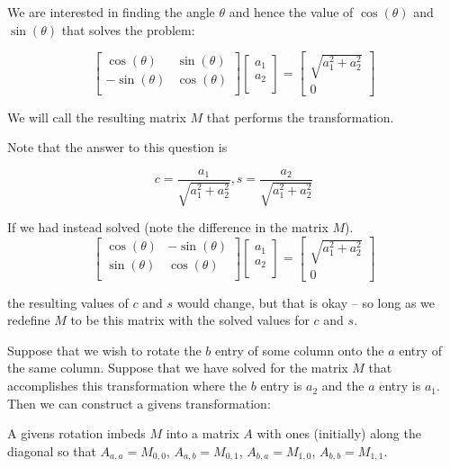 \documentclass[../main.tex]{subfiles}
\begin{document}
\begin{remark}
    We are interested in finding the angle $\theta$ and hence the value of $\cos(\theta)$ and $\sin(\theta)$ that solves the problem:

    \[
        \begin{bmatrix}
            \cos(\theta) & \sin(\theta) \\
            -\sin(\theta) & \cos(\theta) \\
        \end{bmatrix}
        \begin{bmatrix}
            a_1 \\
            a_2 \\
        \end{bmatrix}
        = 
        \begin{bmatrix}
            \sqrt{a_1^2 + a_2^2} \\
            0
        \end{bmatrix}
    \]

    We will call the resulting matrix $M$ that performs the transformation.

    Note that the answer to this question is

    \[
        c = \frac{a_1}{\sqrt{a_1^2 + a_2^2}}, s= \frac{a_2}{\sqrt{a_1^2 + a_2^2}}
    \]

    If we had instead solved (note the difference in the matrix $M$).
    \[
        \begin{bmatrix}
            \cos(\theta) & -\sin(\theta) \\
            \sin(\theta) & \cos(\theta) \\
        \end{bmatrix}
        \begin{bmatrix}
            a_1 \\
            a_2 \\
        \end{bmatrix}
        = 
        \begin{bmatrix}
            \sqrt{a_1^2 + a_2^2} \\
            0
        \end{bmatrix}
    \]

    the resulting values of $c$ and $s$ would change, but that is okay -- so long as we redefine $M$ to be this matrix with the solved values for $c$ and $s$.
\end{remark}

\begin{remark}
    Suppose that we wish to rotate the $b$ entry of some column onto the $a$ entry of the same column. Suppose that we have solved for the matrix $M$ that accomplishes this transformation where the $b$ entry is $a_2$ and the $a$ entry is $a_1$. Then we can construct a givens transformation:

    A givens rotation imbeds $M$ into a matrix $A$ with ones (initially) along the diagonal so that $A_{a,a} = M_{0,0}$, $A_{a,b} = M_{0,1}$, $A_{b,a} = M_{1,0}$, $A_{b,b} = M_{1,1}$.
\end{remark}
\end{document}
